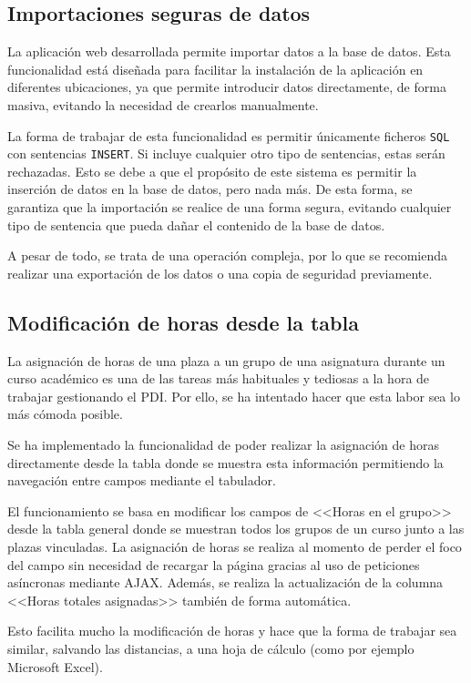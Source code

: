 \subsection{Importaciones seguras de datos}
La aplicación web desarrollada permite importar datos a la base de datos.
Esta funcionalidad está diseñada para facilitar la instalación de la aplicación en diferentes ubicaciones, ya que permite introducir datos directamente, de forma masiva, evitando la necesidad de crearlos manualmente.

La forma de trabajar de esta funcionalidad es permitir únicamente ficheros \texttt{SQL} con sentencias \texttt{INSERT}. 
Si incluye cualquier otro tipo de sentencias, estas serán rechazadas.
Esto se debe a que el propósito de este sistema es permitir la inserción de datos en la base de datos, pero nada más.
De esta forma, se garantiza que la importación se realice de una forma segura, evitando cualquier tipo de sentencia que pueda dañar el contenido de la base de datos.

A pesar de todo, se trata de una operación compleja, por lo que se recomienda realizar una exportación de los datos o una copia de seguridad previamente.

\subsection{Modificación de horas desde la tabla}
La asignación de horas de una plaza a un grupo de una asignatura durante un curso académico es una de las tareas más habituales y tediosas a la hora de trabajar gestionando el PDI. 
Por ello, se ha intentado hacer que esta labor sea lo más cómoda posible.

Se ha implementado la funcionalidad de poder realizar la asignación de horas directamente desde la tabla donde se muestra esta información permitiendo la navegación entre campos mediante el tabulador.

El funcionamiento se basa en modificar los campos de <<Horas en el grupo>> desde la tabla general donde se muestran todos los grupos de un curso junto a las plazas vinculadas. 
La asignación de horas se realiza al momento de perder el foco del campo sin necesidad de recargar la página gracias al uso de peticiones asíncronas mediante AJAX.
Además, se realiza la actualización de la columna <<Horas totales asignadas>> también de forma automática.

Esto facilita mucho la modificación de horas y hace que la forma de trabajar sea similar, salvando las distancias, a una hoja de cálculo (como por ejemplo Microsoft Excel).

